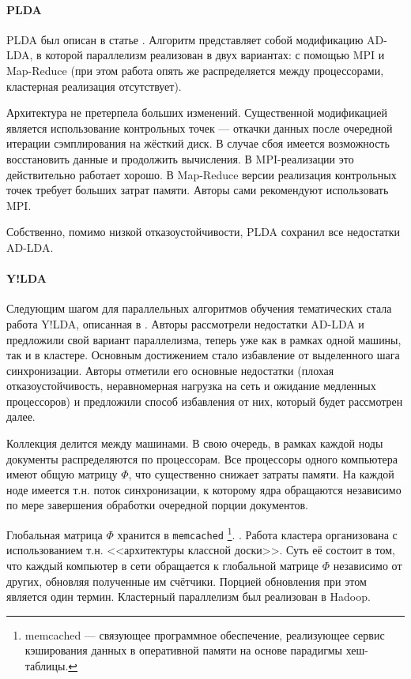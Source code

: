 \paragraph{PLDA}
PLDA был описан в статье \cite{plda}. Алгоритм представляет собой модификацию AD-LDA, в которой параллелизм реализован в двух вариантах: с помощью MPI и Map-Reduce (при этом работа опять же распределяется между процессорами, кластерная реализация отсутствует). 

Архитектура не претерпела больших изменений. Существенной модификацией является использование контрольных точек --- откачки данных после очередной итерации сэмплирования на жёсткий диск. В случае сбоя имеется возможность восстановить данные и продолжить вычисления. В MPI-реализации это действительно работает хорошо. В Map-Reduce версии реализация контрольных точек требует больших затрат памяти. Авторы сами рекомендуют использовать MPI.

Собственно, помимо низкой отказоустойчивости, PLDA сохранил все недостатки AD-LDA.

\paragraph{Y!LDA}
Следующим шагом для параллельных алгоритмов обучения тематических стала работа Y!LDA, описанная в \cite{y_lda}. Авторы рассмотрели недостатки AD-LDA и предложили свой вариант параллелизма, теперь уже как в рамках одной машины, так и в кластере. Основным достижением стало избавление от выделенного шага синхронизации. Авторы отметили его основные недостатки (плохая отказоустойчивость, неравномерная нагрузка на сеть и ожидание медленных процессоров) 
и предложили способ избавления от них, который будет рассмотрен далее.

Коллекция делится между машинами. В свою очередь, в рамках каждой ноды документы распределяются по процессорам. Все процессоры одного компьютера имеют общую матрицу $\Phi$, что существенно снижает затраты памяти. На каждой ноде имеется т.н. поток синхронизации, к которому ядра обращаются независимо по мере завершения обработки очередной порции документов.

Глобальная матрица $\Phi$ хранится в \verb|memcached|
\footnote{memcached — связующее программное обеспечение, реализующее сервис кэширования данных в оперативной памяти на основе парадигмы хеш-таблицы.}.
.
Работа кластера организована с использованием т.н. <<архитектуры классной доски>>. Суть её состоит в том, что каждый компьютер в сети обращается к глобальной матрице $\Phi$ независимо от других, обновляя полученные им счётчики. Порцией обновления при этом является один термин. Кластерный параллелизм был реализован в Hadoop.


